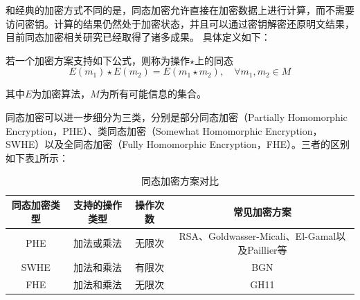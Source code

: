和经典的加密方式不同的是，同态加密允许直接在加密数据上进行计算，而不需要访问密钥。计算的结果仍然处于加密状态，并且可以通过密钥解密还原明文结果，目前同态加密相关研究已经取得了诸多成果。
具体定义如下\cite{acar2018survey}：

\begin{definition}
	若一个加密方案支持如下公式，则称为操作$ \star $上的同态
	\begin{equation}
		E\left(m_1\right) \star E\left(m_2\right)=E\left(m_1 \star m_2\right), \quad \forall m_1, m_2 \in M
	\end{equation}

	其中$ E $为加密算法，$ M $为所有可能信息的集合。
\end{definition}

同态加密可以进一步细分为三类，分别是部分同态加密（Partially Homomorphic Encryption，PHE）、类同态加密（Somewhat Homomorphic Encryption，SWHE）以及全同态加密（Fully Homomorphic Encryption，FHE）。三者的区别如下表\ref{s1-table-he}所示：

\begin{table}[htbp]
	\renewcommand{\arraystretch}{1.3}
	\caption{同态加密方案对比}
	\label{s1-table-he}
	\begin{tabular}{c|c|c|c}
		\hline
		同态加密类型 & 支持的操作类型 & 操作次数 & 常见加密方案                                   \\
		\hline
		PHE          & 加法或乘法     & 无限次   & RSA、Goldwasser-Micali、El-Gamal以及Paillier等 \\
		\hline
		SWHE         & 加法和乘法     & 有限次   & BGN                                            \\
		\hline
		FHE          & 加法和乘法     & 无限次   & GH11                                           \\
		\hline
	\end{tabular}

\end{table}


